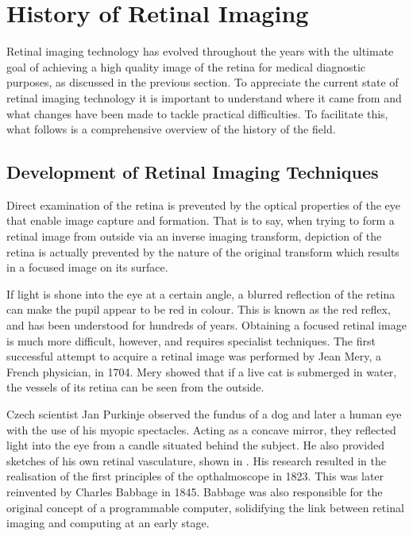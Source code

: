 
\chapter{History of Retinal Imaging}

\label{history_retinal_imaging}

Retinal imaging technology has evolved throughout the years with the ultimate
goal of achieving a high quality image of the retina for medical diagnostic
purposes, as discussed in the previous section.  To appreciate the current
state of retinal imaging technology it is important to understand where it
came from and what changes have been made to tackle practical difficulties.
To facilitate this, what follows is a comprehensive overview of the history of
the field.

\section{Development of Retinal Imaging Techniques}

Direct examination of the retina is prevented by the optical properties of the
eye that enable image capture and formation.  That is to say, when trying to
form a retinal image from outside via an inverse imaging transform, depiction
of the retina is actually prevented by the nature of the original transform which
results in a focused image on its surface.

If light is shone into the eye at a certain angle, a blurred reflection of the
retina can make the pupil appear to be red in colour.  This is known as
the red reflex, and has been understood for hundreds of years.  Obtaining
a focused retinal image is much more difficult, however, and requires
specialist techniques.  The first successful attempt to acquire a retinal
image was performed by Jean Mery, a French physician, in 1704.
\cite{valsalva1704aure}  Mery showed that if a live cat is submerged in
water, the vessels of its retina can be seen from the outside.
\cite{collegeoptometrists}

Czech scientist Jan Purkinje observed the fundus of a dog and later a
human eye with the use of his myopic spectacles.\cite{purkinje2002purkinje}
Acting as a concave mirror, they reflected light into the eye from a candle
situated behind the subject.  He also provided sketches of his own retinal
vasculature, shown in .  His research resulted in
the realisation of the first principles of the opthalmoscope in 1823.\cite{albert1973jan}
This was later reinvented by Charles Babbage in 1845.\cite{flick1947centenary,keeler1997150}
Babbage was also responsible for the original concept of a programmable
computer, solidifying the link between retinal imaging and computing at an
early stage.\cite{halacy1970charles}

